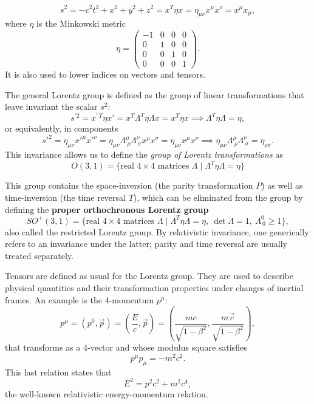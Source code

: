 \[
    s^2 = -c^2 t^2 + x^2 + y^2 + z^2 = x^T \eta x = \eta_{\mu \nu} x^\mu x^\nu = x^\mu x_\mu,
\]
where $\eta$ is the Minkowski metric
\begin{equation}
    \eta = \begin{pmatrix}
        -1 & 0 & 0 & 0 \\
        0  & 1 & 0 & 0 \\
        0  & 0 & 1 & 0 \\
        0  & 0 & 0 & 1
    \end{pmatrix}.
    \label{eq:Minkowski_metric}
\end{equation}
It is also used to lower indices on vectors and tensors.

The general Lorentz group is defined as the group of linear transformations that leave invariant the scalar $s^2$:
\[
    s^{\prime 2} = x^{\prime\,T} \eta x' = x^T \Lambda^T \eta \Lambda x = x^T \eta x \implies \Lambda^T \eta \Lambda = \eta,
\]
or equivalently, in components
\[
    s'^2 = \eta_{\mu \nu} x'^\mu x'^\nu = \eta_{\mu \nu} \Lambda^\mu_{\ \rho} \Lambda^\nu_{\ \sigma} x^\rho x^\sigma = \eta_{\mu \nu} x^\mu x^\nu \implies \eta_{\mu \nu} \Lambda^\mu_{\ \rho} \Lambda^\nu_{\ \sigma} = \eta_{\rho \sigma}.
\]
This invariance allows us to define the \textit{group of Lorentz transformations} as
\begin{equation}
    O(3,1) = \{ \text{real } 4 \times 4 \text{ matrices } \Lambda \mid \Lambda^T \eta \Lambda = \eta \}
    \label{eq:Lorentz_group_definition}
\end{equation}

This group contains the space-inversion (the parity transformation $P$) as well as time-inversion (the time reversal $T$), which can be eliminated from the group by defining the \textbf{proper orthochronous Lorentz group}
\begin{equation}
    SO^+(3,1) = \{ \text{real } 4 \times 4 \text{ matrices } \Lambda \mid \Lambda^T \eta \Lambda = \eta, \ \det \Lambda = 1, \ \Lambda^0_{\ 0} \geq 1 \},
    \label{eq:proper_orthochronous_Lorentz_group_definition}
\end{equation}
also called the restricted Lorentz group. By relativistic invariance, one generically refers to an invariance under the latter; parity and time reversal are usually treated separately.

Tensors are defined as usual for the Lorentz group. They are used to describe physical quantities and their transformation properties under changes of inertial frames. An example is
the 4-momentum $p^\mu$:
\[
    p^\mu = (p^0, \vec{p}) = \left( \frac{E}{c}, \vec{p} \right) = \left( \frac{mc}{\sqrt{1 - \beta^2}}, \frac{m \vec{v}}{\sqrt{1 - \beta^2}} \right),
\]
that transforms as a 4-vector and whose modulus square satisfies
\[
    p^\mu p_\mu = -m^2 c^2.
\]
This last relation states that
\[
    E^2 = p^2 c^2 + m^2 c^4,
\]
the well-known relativistic energy-momentum relation.

